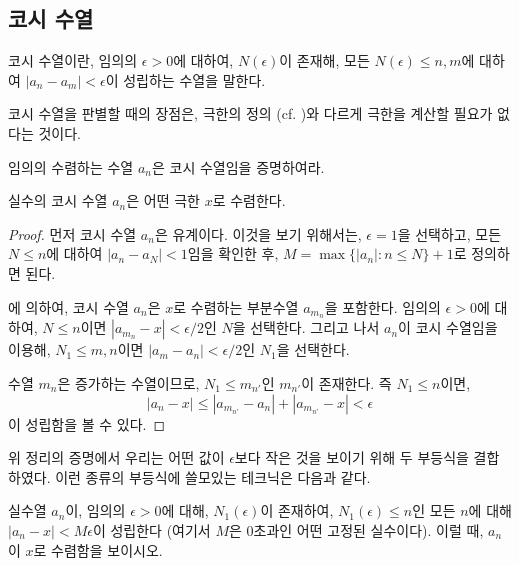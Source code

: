 \subsection{코시 수열}
\begin{definition}
\label{def:cauchyseq}
    코시 수열이란, 임의의 $\epsilon > 0$에 대하여, $N(\epsilon)$이 존재해, 모든 $N(\epsilon) \leq n, m$에 대하여 $|a_n - a_m| < \epsilon$이 성립하는 수열을 말한다.
\end{definition}
코시 수열을 판별할 때의 장점은, 극한의 정의 (cf. )와 다르게 극한을 계산할 필요가 없다는 것이다.
\begin{exercise}
    임의의 수렴하는 수열 $a_n$은 코시 수열임을 증명하여라.
\end{exercise}

\begin{theorem}
\label{thm:realcomp}
    실수의 코시 수열 $a_n$은 어떤 극한 $x$로 수렴한다.
\end{theorem}
\begin{proof}
    먼저 코시 수열 $a_n$은 유계이다.
    이것을 보기 위해서는, $\epsilon = 1$을 선택하고, 모든 $N \leq n$에 대하여 $|a_n - a_N| < 1$임을 확인한 후, $M = \max \{|a_n| : n \leq N\} + 1$로 정의하면 된다.
    
    에 의하여, 코시 수열 $a_n$은 $x$로 수렴하는 부분수열 $a_{m_n}$을 포함한다.
    임의의 $\epsilon > 0$에 대하여, $N \leq n$이면 $|a_{m_n} - x| < \epsilon/2$인 $N$을 선택한다.
    그리고 나서 $a_n$이 코시 수열임을 이용해, $N_1 \leq m, n$이면 $|a_m - a_n| < \epsilon/2$인 $N_1$을 선택한다.

    수열 $m_n$은 증가하는 수열이므로, $N_1 \leq m_{n'}$인 $m_{n'}$이 존재한다.
    즉 $N_1 \leq n$이면,
    \begin{equation*}
        |a_n - x| \leq |a_{m_{n'}} - a_n| + |a_{m_{n'}} - x| < \epsilon
    \end{equation*}
    이 성립함을 볼 수 있다.
\end{proof}
\begin{exercise}
    위 정리의 증명에서 우리는 어떤 값이 $\epsilon$보다 작은 것을 보이기 위해 두 부등식을 결합하였다.
    이런 종류의 부등식에 쓸모있는 테크닉은 다음과 같다.

    실수열 $a_n$이, 임의의 $\epsilon > 0$에 대해, $N_1(\epsilon)$이 존재하여, $N_1(\epsilon) \leq n$인 모든 $n$에 대해 $|a_n - x| < M\epsilon$이 성립한다 (여기서 $M$은 $0$초과인 어떤 고정된 실수이다).
    이럴 때, $a_n$이 $x$로 수렴함을 보이시오.
\end{exercise}
